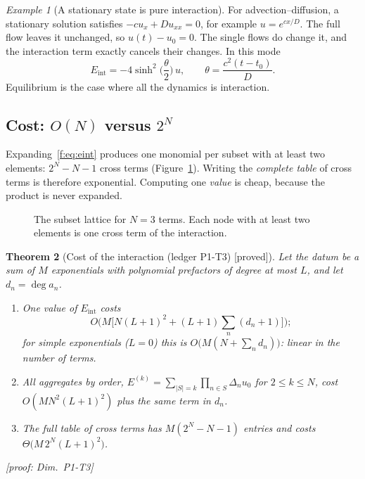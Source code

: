 \documentclass[11pt]{article}
\theoremstyle{plain}
\newtheorem{theorem}{Theorem}[section]
\theoremstyle{definition}
\theoremstyle{remark}
\newtheorem{example}[theorem]{Example}
\newcommand{\Eint}{E_{\mathrm{int}}}        %
\newcommand{\badge}[2]{\textcolor{#1}{\textsf{\footnotesize[#2]}}}
\newcommand{\proved}[1][]{\badge{cC}{proved#1}}
\newcommand{\led}[1]{\textcolor{cG}{\textsf{\footnotesize(ledger #1)}}}
\newcommand{\dimref}[1]{\textsf{\footnotesize[proof: Dim.~#1]}}
\begin{document}
\begin{example}[{A stationary state is pure interaction}]
For advection--diffusion, a stationary solution satisfies $-cu_x+Du_{xx}=0$, for example $u=e^{cx/D}$. The full flow leaves it unchanged, so $u(t)-u_0=0$. The single flows do change it, and the interaction term exactly cancels their changes. In this mode
\[
\Eint=-4\sinh^2\!\Big(\frac{\theta}{2}\Big)\,u,\qquad \theta=\frac{c^2(t-t_0)}{D}.
\]
Equilibrium is the case where all the dynamics is interaction.
\end{example}

\subsection{Cost: $O(N)$ versus $2^N$}

Expanding~\eqref{f:eq:eint} produces one monomial per subset with at least two elements: $2^N-N-1$ cross terms (Figure~\ref{f:fig:lattice}). Writing the \emph{complete table} of cross terms is therefore exponential. Computing one \emph{value} is cheap, because the product is never expanded.

\begin{figure}[!htb]
\centering
{}
\caption{The subset lattice for $N=3$ terms. Each node with at least two elements is one cross term of the interaction.}\label{f:fig:lattice}
\end{figure}

\begin{theorem}[{Cost of the interaction \led{P1-T3} \proved}]\label{thm:cost}
Let the datum be a sum of $M$ exponentials with polynomial prefactors of degree at most $L$, and let $d_n=\deg a_n$.
\begin{enumerate}[label=(\alph*)]
\item One value of $\Eint$ costs
\[
O\Big(M\big[N(L+1)^2+(L+1)\textstyle\sum_n(d_n+1)\big]\Big);
\]
for simple exponentials ($L=0$) this is $O\big(M(N+\sum_nd_n)\big)$: linear in the number of terms.
\item All aggregates by order, $E^{(k)}=\sum_{|S|=k}\prod_{n\in S}\Delta_nu_0$ for $2\le k\le N$, cost $O(MN^2(L+1)^2)$ plus the same term in $d_n$.
\item The full table of cross terms has $M(2^N-N-1)$ entries and costs $\Theta\big(M\,2^N(L+1)^2\big)$.
\end{enumerate}
\dimref{P1-T3}
\end{theorem}
\end{document}

